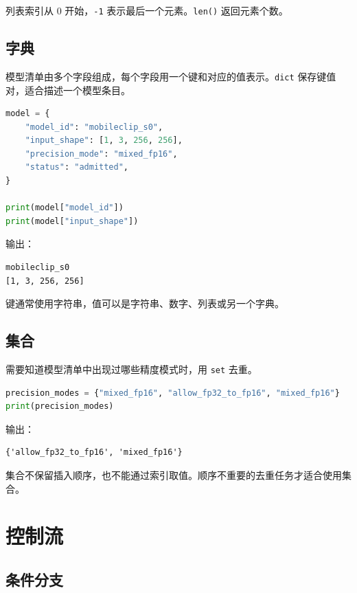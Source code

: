 列表索引从 0 开始，\passthrough{\lstinline!-1!}
表示最后一个元素。\passthrough{\lstinline!len()!} 返回元素个数。

\subsection{字典}\label{ux5b57ux5178}

模型清单由多个字段组成，每个字段用一个键和对应的值表示。\passthrough{\lstinline!dict!}
保存键值对，适合描述一个模型条目。

\begin{lstlisting}[language=Python]
model = {
    "model_id": "mobileclip_s0",
    "input_shape": [1, 3, 256, 256],
    "precision_mode": "mixed_fp16",
    "status": "admitted",
}

print(model["model_id"])
print(model["input_shape"])
\end{lstlisting}

输出：

\begin{lstlisting}
mobileclip_s0
[1, 3, 256, 256]
\end{lstlisting}

键通常使用字符串，值可以是字符串、数字、列表或另一个字典。

\subsection{集合}\label{ux96c6ux5408}

需要知道模型清单中出现过哪些精度模式时，用 \passthrough{\lstinline!set!}
去重。

\begin{lstlisting}[language=Python]
precision_modes = {"mixed_fp16", "allow_fp32_to_fp16", "mixed_fp16"}
print(precision_modes)
\end{lstlisting}

输出：

\begin{lstlisting}
{'allow_fp32_to_fp16', 'mixed_fp16'}
\end{lstlisting}

集合不保留插入顺序，也不能通过索引取值。顺序不重要的去重任务才适合使用集合。

\section{控制流}\label{ux63a7ux5236ux6d41}

\subsection{条件分支}\label{ux6761ux4ef6ux5206ux652f}


